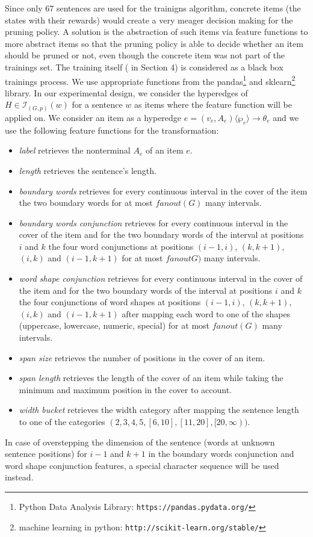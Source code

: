 \documentclass{tudscrartcl}
\theoremstyle{definition}
\begin{document}
Since only $67$ sentences are used for the trainigns algorithm, concrete items (the states with their rewards) would create a very meager decision making for the pruning policy.
A solution is the abstraction of such items via feature functions to more abstract items so that the pruning policy is able to decide whether an item should be pruned or not, even though the concrete item was not part of the trainings set.
The training itself ( in Section 4) is considered as a black box trainings process. We use appropriate functions from the pandas\footnote{Python Data Analysis Library: \texttt{https://pandas.pydata.org/}} and sklearn\footnote{machine learning in python: \texttt{http://scikit-learn.org/stable/}} library.
In our experimental design, we consider the hyperedges of $H \in \mathcal{I}_{(G, p)}(w)$ for a sentence $w$ as items where the feature function will be applied on.
We consider an item as a hyperedge $e = (v_e, A_e)\langle \wp_e \rangle \to \theta_e$ and
we use the following feature functions for the transformation:
\begin{itemize}
	\item \emph{label} retrieves the nonterminal $A_e$ of an item $e$.
	\item \emph{length} retrieves the sentence's length.
	\item \emph{boundary words} retrieves for every continuous interval in the cover
		of the item the two boundary words for at most $fanout(G)$ many intervals.
	\item \emph{boundary words conjunction} retrieves for every continuous interval
		in the cover of the item and for the two boundary words of the interval at
		positions $i$ and $k$
		the four word conjunctions at positions $(i-1, i)$, $(k, k+1)$, $(i, k)$ and
		$(i-1, k+1)$ for at most $fanoutG)$ many intervals.
	\item \emph{word shape conjunction} retrieves for every continuous interval in the
		cover of the item and for the two boundary words of the interval at positions
		$i$ and $k$ the four conjunctions of word shapes at positions
		$(i-1, i)$, $(k, k+1)$, $(i, k)$ and $(i-1, k+1)$ after mapping
		each word to one of the shapes (uppercase, lowercase, numeric, special) for
		at most $fanout(G)$ many intervals.
	\item \emph{span size} retrieves the number of positions in the cover of an item.
	\item \emph{span length} retrieves the length of the cover of an item while taking
		the minimum and maximum position in the cover to account.
	\item \emph{width bucket} retrieves the width category after mapping the sentence
		length to one of the categories $(2, 3, 4, 5, [6, 10], [11, 20], [20, \infty))$.
\end{itemize}
In case of overstepping the dimension of the sentence (words at unknown sentence positions) for $i -1$ and $k + 1$ in the boundary words conjunction and word shape conjunction features, a special character sequence will be used instead.
\end{document}
